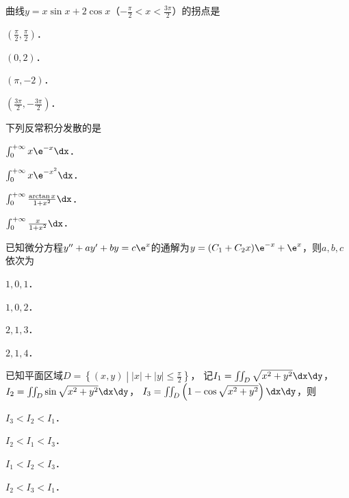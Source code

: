 \documentclass[plain,noanswer,medmath]{../../template/jnuexam}
\begin{document}








\begin{problem}
曲线$y = x\sin x + 2\cos x$（$- \frac{\pi}{2} < x < \frac{3\pi}{2}$）的拐点是\pickout{}
\begin{abcd}
\item $\left(\frac{\pi}{2},\frac{\pi}{2} \right)$．
\item $(0,2)$．
\item $(\pi , - 2)$．
\item $\left(\frac{3\pi}{2}, - \frac{3\pi}{2} \right)$．
\end{abcd}
\end{problem}


\begin{problem}
下列反常积分发散的是\pickout{}
\begin{abcd}
\item $\int_0^{+\infty} x\e^{- x} \dx$．
\item $\int_0^{+\infty} x\e^{- x^2} \dx$．
\item $\int_0^{+\infty} \frac{\arctan x}{1 + x^2}\dx$．
\item $\int_0^{+\infty} \frac{x}{1 + x^2}\dx$．
\end{abcd}
\end{problem}


\begin{problem}
已知微分方程$y'' + ay' + by = c\e^x$的通解为$y = (C_1 + C_2 x) \e^{- x} + \e^x$，则$a,b,c$依次为\pickout{}
\begin{abcd}
\item $1,0,1$．
\item $1,0,2$．
\item $2,1,3$．
\item $2,1,4$．
\end{abcd}
\end{problem}


\begin{problem}
已知平面区域$D = \left\{(x,y)\middle||x| + |y| \le \frac{\pi}{2} \right\}$，
记$I_1 = \iint_D \sqrt{x^2 + y^2} \dx\dy$，\goodbreak $I_2 = \iint_D \sin \sqrt{x^2 + y^2} \dx\dy$，
$I_3 = \iint_D \left(1 - \cos \sqrt{x^2 + y^2} \right) \dx\dy$，则\pickout{}
\begin{abcd}
\item $I_3 < I_2 < I_1$．
\item $I_2 < I_1 < I_3$．
\item $I_1 < I_2 < I_3$．
\item $I_2 < I_3 < I_1$．
\end{abcd}
\end{problem}
\end{document}
